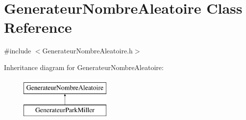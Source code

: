 \hypertarget{classGenerateurNombreAleatoire}{\section{Generateur\-Nombre\-Aleatoire Class Reference}
\label{classGenerateurNombreAleatoire}
}


{\ttfamily \#include $<$Generateur\-Nombre\-Aleatoire.\-h$>$}

Inheritance diagram for Generateur\-Nombre\-Aleatoire\-:\begin{figure}[H]
\begin{center}
\leavevmode
\includegraphics[height=2.000000cm]{classGenerateurNombreAleatoire}
\end{center}
\end{figure}
